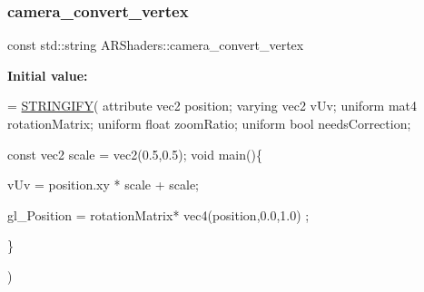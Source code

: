 \subsubsection{\texorpdfstring{camera\+\_\+convert\+\_\+vertex}{camera\_convert\_vertex}}
{\footnotesize\ttfamily const std\+::string A\+R\+Shaders\+::camera\+\_\+convert\+\_\+vertex}

{\bfseries Initial value\+:}
\begin{DoxyCode}
= \mbox{\hyperlink{_a_r_shaders_8h_ab06e1eb2e9bf38e0d452b1f796aed208}{STRINGIFY}}(
                                                    attribute vec2 position;
                                                    varying vec2 vUv;
                                                    uniform mat4 rotationMatrix;
                                                    uniform \textcolor{keywordtype}{float} zoomRatio;
                                                    uniform \textcolor{keywordtype}{bool} needsCorrection;
                                                    
                                                    \textcolor{keyword}{const} vec2 scale = vec2(0.5,0.5);
                                                    \textcolor{keywordtype}{void} main()\{
                                                       
                                                        
                                                        vUv = position.xy * scale + scale;
                                                        
                               
                                                        
                                                       gl\_Position = rotationMatrix* vec4(position,0.0,1.0)
      ;
                                                    
                                                        
                                                        
                                                    \}
                                                    
                                                    
                                                    )
\end{DoxyCode}
\mbox{\label{namespace_a_r_shaders_ad415abff7a73d38ae981dd4be29a7076}} 
